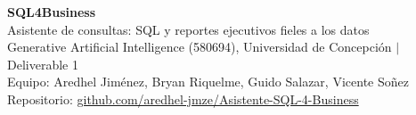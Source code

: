 \documentclass[10pt]{article}
\begin{document}
\begin{center}
{\Large\bfseries\color{ucblue} SQL4Business}\\[6pt]
{\large Asistente de consultas: SQL y reportes ejecutivos fieles a los datos}\\[3pt]
{\small\color{ucgray} Generative Artificial Intelligence (580694), Universidad de Concepci\'on \quad$\vert$\quad Deliverable 1}\\[2pt]
{\small\color{ucgray} Equipo: Aredhel Jim\'enez, Bryan Riquelme, Guido Salazar, Vicente So\~nez}\\[2pt]
{\small\color{ucgray} Repositorio: \href{https://github.com/aredhel-jmze/Asistente-SQL-4-Business}{github.com/aredhel-jmze/Asistente-SQL-4-Business}}
\end{center}

\vspace{2pt}
\end{document}
